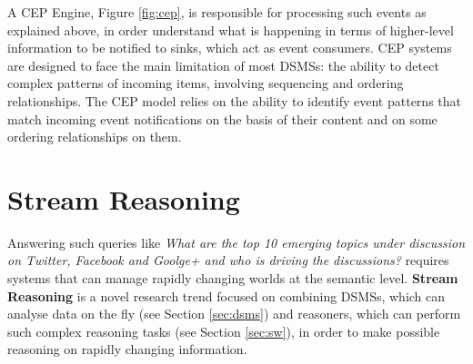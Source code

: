 A CEP Engine, Figure \ref{fig:cep}, is responsible for processing such events as explained above, in order understand what is happening in terms of higher-level information to be notified to sinks, which act as event consumers. CEP systems are designed to face the main limitation of most DSMSs: the ability to detect complex patterns of incoming items, involving sequencing and ordering relationships. The CEP model relies on the ability to identify event patterns that match incoming event notifications on the basis of their content and on some ordering relationships on them.


\section{Stream Reasoning}\label{sec:sfp}

Answering such queries like \textit{What are the top 10 emerging topics under discussion on Twitter, Facebook and Goolge+ and who is driving the discussions?} requires systems that can manage rapidly changing worlds at the semantic level. \textbf{Stream Reasoning} is a novel research trend focused on combining DSMSs, which can analyse data on the fly (see Section \ref{sec:dsms}) and reasoners, which can perform such complex reasoning tasks (see Section \ref{sec:sw}), in order to make possible reasoning on rapidly changing information.



